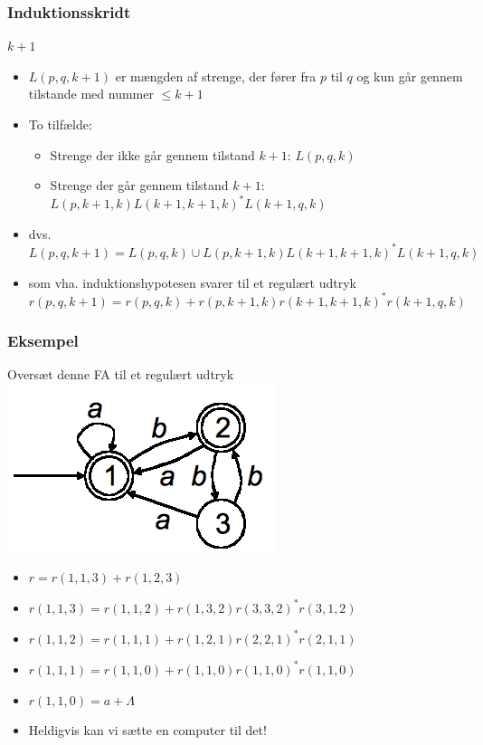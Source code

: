 \begin{frame}
\frametitle{Induktionsskridt}
$k+1$
\begin{itemize}[<+->]
\item $L(p, q, k + 1)$ er mængden af strenge, der fører fra $p$ til $q$ 
og kun går gennem tilstande med nummer $\leq k + 1$
\item
To tilfælde:

\begin{itemize}[<+->]
\item 
  Strenge der ikke går gennem tilstand $k + 1$: $L(p, q, k)$ 
\item Strenge
  der går gennem tilstand $k + 1$: $L(p, k + 1, k) L(k + 1, k + 1, k)^*
  L(k + 1, q, k)$
\end{itemize}
\item dvs. $L(p, q, k + 1) = L(p, q, k) \cup 
			    L(p, k + 1, k) L(k + 1, k + 1, k)^* L(k + 1, q, k)$
\item som vha. induktionshypotesen svarer til et regulært udtryk 
	$r(p, q, k + 1) = r(p, q, k) + 
			    r(p, k + 1, k) r(k + 1, k + 1, k)^* r(k + 1, q, k)$
\end{itemize}
\end{frame}
\begin{frame}
\frametitle{Eksempel}
Oversæt denne FA til et regulært udtryk
\includegraphics[scale=0.4]{images/2_seminar_kleene_2_ex.png}
\begin{itemize}[<+->]
\item $r = r(1,1,3) + r(1,2,3)$
\item $r(1,1,3) = r(1,1,2) + r(1,3,2)r(3,3,2)^*r(3,1,2)$
\item $r(1,1,2) = r(1,1,1) + r(1,2,1)r(2,2,1)^*r(2,1,1)$
\item $r(1,1,1) = r(1,1,0) + r(1,1,0)r(1,1,0)^*r(1,1,0)$
\item $r(1,1,0) = a + \Lambda$
\item Heldigvis kan vi sætte en computer til det!
\end{itemize}
\end{frame}
